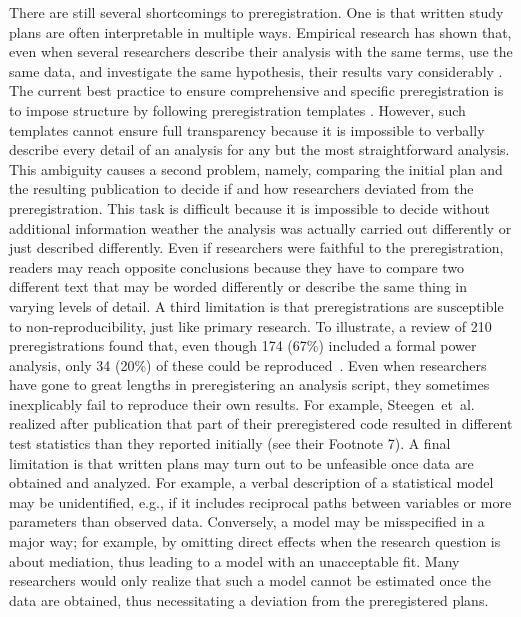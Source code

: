 \documentclass[psych,tutorial,accept,moreauthors,pdftex]{Definitions/mdpi}
\begin{document}
\begin{paracol}{2}
There are still several shortcomings to preregistration. One is that
written study plans are often interpretable in multiple ways. Empirical
research has shown that, even when several researchers describe their
analysis with the same terms, use the same data, and investigate the
same hypothesis, their results vary considerably
\citep{silberzahnManyAnalystsOne2018}. The current best practice to
ensure comprehensive and specific preregistration is to impose structure
by following preregistration templates
\citep{bowmanOSFPreregTemplate2020, bakkerEnsuringQualitySpecificity2020}.
However, such templates cannot ensure full transparency because it is
impossible to verbally describe every detail of an analysis for any but
the most straightforward analysis. This ambiguity causes a second
problem, namely, comparing the initial plan and the resulting
publication to decide if and how researchers deviated from the
preregistration. This task is difficult because it is impossible to
decide without additional information weather the analysis was actually
carried out differently or just described differently. Even if
researchers were faithful to the preregistration, readers may reach
opposite conclusions because they have to compare two different text
that may be worded differently or describe the same thing in varying
levels of detail. A third limitation is that preregistrations are
susceptible to non-reproducibility, just like primary research. To
illustrate, a review of 210 preregistrations found that, even though 174
(67\%) included a formal power analysis, only 34 (20\%) of these could
be reproduced~\citep{bakkerRecommendationsPreregistrationsInternal2020}.
Even when researchers have gone to great lengths in preregistering an
analysis script, they sometimes inexplicably fail to reproduce their own
results. For example, Steegen~et~al.~\citep{steegenMeasuringCrowdAgain2014} realized
after publication that part of their preregistered code resulted in
different test statistics than they reported initially (see their
Footnote 7). A final limitation is that written plans may turn out to be
unfeasible once data are obtained and analyzed. For example, a verbal
description of a statistical model may be unidentified, e.g., if it
includes reciprocal paths between variables or more parameters than
observed data. Conversely, a model may be misspecified in a major way;
for example, by omitting direct effects when the research question is
about mediation, thus leading to a model with an unacceptable fit. Many
researchers would only realize that such a model cannot be estimated
once the data are obtained, thus necessitating a deviation from the
preregistered plans.


\end{paracol}
\end{document}
